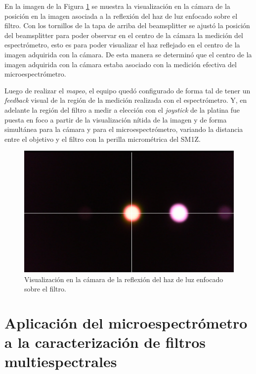  En la imagen de la Figura \ref{fig:refhazz} se muestra la visualización en la cámara de la posición en la imagen asociada a la reflexión del haz de luz enfocado sobre el filtro. Con los tornillos de la tapa de arriba del beamsplitter se ajustó la posición del beamsplitter para poder observar en el centro de la cámara la medición del espectrómetro, esto es para poder visualizar el haz reflejado en el centro de la imagen adquirida con la cámara. De esta manera se determinó que el centro de la imagen adquirida con la cámara estaba asociado con la medición efectiva del microespectrómetro.

Luego de realizar el \textit{mapeo}, el equipo quedó configurado de forma tal de tener un \textit{feedback} visual de la región de la medición realizada con el espectrómetro. Y, en adelante la región del filtro a medir a elección con el \textit{joystick} de la platina fue puesta en foco a partir de la visualización nítida de la imagen y de forma simultánea para la cámara y para el microespectrómetro, variando la distancia entre el objetivo y el filtro con la perilla micrométrica del SM1Z.

\begin{figure}[H]
	\centering
	\includegraphics[scale=0.5]{Figs/microespectrometro/mapspectrometrocamera.png}
	\caption{Visualización en la cámara de la reflexión del haz de luz enfocado sobre el filtro.}
	\label{fig:refhazz}
\end{figure}



\singlespacing
\section{Aplicación del microespectrómetro a la caracterización de filtros multiespectrales}
\label{sec:resgrales}

